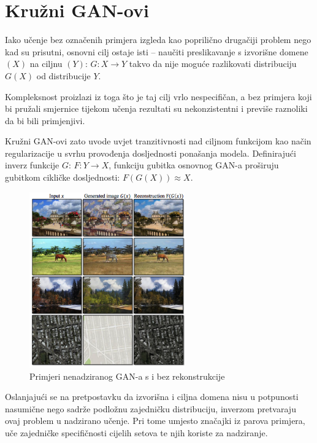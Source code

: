 \documentclass[lmodern, utf8, seminar]{fer}
\begin{document}
\newpage
\section{Kružni GAN-ovi}
Iako učenje bez označenih primjera izgleda kao poprilično drugačiji problem nego kad su prisutni, osnovni cilj ostaje isti -- naučiti preslikavanje s izvorišne domene $(X)$ na ciljnu $(Y)$: $G: X\rightarrow Y$ takvo da nije moguće razlikovati distribuciju $G(X)$ od distribucije $Y$. 

Kompleksnost proizlazi iz toga što je taj cilj vrlo nespecifičan, a bez primjera koji bi pružali smjernice tijekom učenja rezultati su nekonzistentni i previše raznoliki da bi bili primjenjivi.

Kružni GAN-ovi zato uvode uvjet tranzitivnosti nad ciljnom funkcijom kao način regularizacije u svrhu provođenja dosljednosti ponašanja modela.
Definirajući inverz funkcije $G$: $F: Y \rightarrow X$, funkciju gubitka osnovnog GAN-a proširuju gubitkom cikličke dosljednosti: $F(G(X)) \approx X$.

\begin{figure}[H]
    \centering
    \includegraphics[width=0.6\textwidth]{zhu2017unpaired-reconstruction}
    \caption{Primjeri nenadziranog GAN-a s i bez rekonstrukcije}
    \label{fig:zhu2017unpaired-reconstruction}
\end{figure}

Oslanjajući se na pretpostavku da izvorišna i ciljna domena nisu u potpunosti nasumične nego sadrže podložnu zajedničku distribuciju, inverzom pretvaraju ovaj problem u nadzirano učenje. Pri tome umjesto značajki iz parova primjera, uče zajedničke specifičnosti cijelih setova te njih koriste za nadziranje.
\end{document}
